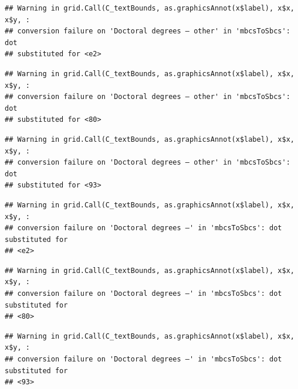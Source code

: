 \documentclass[
]{book}
\newenvironment{Shaded}{\begin{snugshade}}{\end{snugshade}}
\newcommand{\CommentTok}[1]{\textcolor[rgb]{0.56,0.35,0.01}{\textit{#1}}}
\newcommand{\DataTypeTok}[1]{\textcolor[rgb]{0.13,0.29,0.53}{#1}}
\newcommand{\KeywordTok}[1]{\textcolor[rgb]{0.13,0.29,0.53}{\textbf{#1}}}
\newcommand{\NormalTok}[1]{#1}
\newcommand{\OperatorTok}[1]{\textcolor[rgb]{0.81,0.36,0.00}{\textbf{#1}}}
\newcommand{\StringTok}[1]{\textcolor[rgb]{0.31,0.60,0.02}{#1}}
\begin{document}
\begin{Shaded}
\end{Shaded}

\begin{verbatim}
## Warning in grid.Call(C_textBounds, as.graphicsAnnot(x$label), x$x, x$y, :
## conversion failure on 'Doctoral degrees – other' in 'mbcsToSbcs': dot
## substituted for <e2>
\end{verbatim}

\begin{verbatim}
## Warning in grid.Call(C_textBounds, as.graphicsAnnot(x$label), x$x, x$y, :
## conversion failure on 'Doctoral degrees – other' in 'mbcsToSbcs': dot
## substituted for <80>
\end{verbatim}

\begin{verbatim}
## Warning in grid.Call(C_textBounds, as.graphicsAnnot(x$label), x$x, x$y, :
## conversion failure on 'Doctoral degrees – other' in 'mbcsToSbcs': dot
## substituted for <93>
\end{verbatim}

\begin{verbatim}
## Warning in grid.Call(C_textBounds, as.graphicsAnnot(x$label), x$x, x$y, :
## conversion failure on 'Doctoral degrees –' in 'mbcsToSbcs': dot substituted for
## <e2>
\end{verbatim}

\begin{verbatim}
## Warning in grid.Call(C_textBounds, as.graphicsAnnot(x$label), x$x, x$y, :
## conversion failure on 'Doctoral degrees –' in 'mbcsToSbcs': dot substituted for
## <80>
\end{verbatim}

\begin{verbatim}
## Warning in grid.Call(C_textBounds, as.graphicsAnnot(x$label), x$x, x$y, :
## conversion failure on 'Doctoral degrees –' in 'mbcsToSbcs': dot substituted for
## <93>
\end{verbatim}
\end{document}
